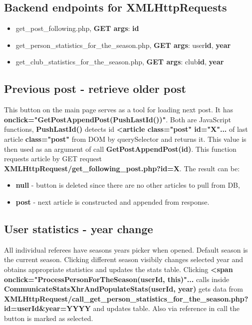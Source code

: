 \subsection*{Backend endpoints for XMLHttpRequests}
\begin{itemize}
    \item get\_post\_following.php, \textbf{GET args}: \textbf{id}
    \item get\_person\_statistics\_for\_the\_season.php, \textbf{GET args}: user\textunderscore \textbf{id}, \textbf{year}
    \item get\_club\_statistics\_for\_the\_season.php, \textbf{GET args}: club\textunderscore \textbf{id}, \textbf{year}
\end{itemize}

\subsection{Previous post - retrieve older post}
This button on the main page serves as a tool for loading next post. It has \textbf{onclick="GetPostAppendPost(PushLastId())"}. Both are JavaScript functions, \textbf{PushLastId()} detects id \textbf{\textless article class="post" id="X"... } of last article \textbf{class="post"} from DOM by querySelector and returns it. This value is then used as an argument of call \textbf{GetPostAppendPost(id)}. This function requests article by GET request \textbf{XMLHttpRequest/get\_following\_post.php?id=X}.  
The result can be:
\begin{itemize}
\item \textbf{null} - button is deleted since there are no other articles to pull from DB,
\item \textbf{post} - next article is constructed and appended from response.
\end{itemize}

\subsection{User statistics - year change}
All individual referees have seasons years picker when opened. Default season is the current season. Clicking different season visibily changes selected year and obtains appropriate statistics and updates the stats table. Clicking \textbf{\textless span onclick="ProcessPersonForTheSeason(userId, this)"... } calls inside \textbf{CommunicateStatsXhrAndPopulateStats(userId, year)} gets data from \textbf{XMLHttpRequest/call\_get\_person\_statistics\_for\_the\_season.php}\newline \textbf{?id=userId\&year=YYYY} and updates table. Also via  reference in call the button is marked as selected.  

